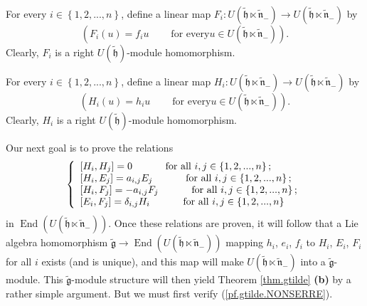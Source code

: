 \documentclass[etingof-lie.tex]{subfiles}
\begin{document}
For every $i\in\left\{  1,2,...,n\right\}  $, define a linear map
$F_{i}:U\left(  \widetilde{\mathfrak{h}}\ltimes\widetilde{\mathfrak{n}}%
_{-}\right)  \rightarrow U\left(  \widetilde{\mathfrak{h}}\ltimes
\widetilde{\mathfrak{n}}_{-}\right)  $ by%
\[
\left(  F_{i}\left(  u\right)  =f_{i}u\ \ \ \ \ \ \ \ \ \ \text{for every
}u\in U\left(  \widetilde{\mathfrak{h}}\ltimes\widetilde{\mathfrak{n}}%
_{-}\right)  \right)  .
\]
Clearly, $F_{i}$ is a right $U\left(  \widetilde{\mathfrak{h}}\right)
$-module homomorphism.

For every $i\in\left\{  1,2,...,n\right\}  $, define a linear map
$H_{i}:U\left(  \widetilde{\mathfrak{h}}\ltimes\widetilde{\mathfrak{n}}%
_{-}\right)  \rightarrow U\left(  \widetilde{\mathfrak{h}}\ltimes
\widetilde{\mathfrak{n}}_{-}\right)  $ by%
\[
\left(  H_{i}\left(  u\right)  =h_{i}u\ \ \ \ \ \ \ \ \ \ \text{for every
}u\in U\left(  \widetilde{\mathfrak{h}}\ltimes\widetilde{\mathfrak{n}}%
_{-}\right)  \right)  .
\]
Clearly, $H_{i}$ is a right $U\left(  \widetilde{\mathfrak{h}}\right)
$-module homomorphism.

Our next goal is to prove the relations%
\begin{equation}
\left\{
\begin{array}
[c]{l}%
\left[  H_{i},H_{j}\right]  =0\ \ \ \ \ \ \ \ \ \ \text{for all }%
i,j\in\left\{  1,2,...,n\right\}  ;\\
\left[  H_{i},E_{j}\right]  =a_{i,j}E_{j}\ \ \ \ \ \ \ \ \ \ \text{for all
}i,j\in\left\{  1,2,...,n\right\}  ;\\
\left[  H_{i},F_{j}\right]  =-a_{i,j}F_{j}\ \ \ \ \ \ \ \ \ \ \text{for all
}i,j\in\left\{  1,2,...,n\right\}  ;\\
\left[  E_{i},F_{j}\right]  =\delta_{i,j}H_{i}\ \ \ \ \ \ \ \ \ \ \text{for
all }i,j\in\left\{  1,2,...,n\right\}
\end{array}
\right.  \label{pf.gtilde.NONSERRE}%
\end{equation}
in $\operatorname*{End}\left(  U\left(  \widetilde{\mathfrak{h}}%
\ltimes\widetilde{\mathfrak{n}}_{-}\right)  \right)  $. Once these relations
are proven, it will follow that a Lie algebra homomorphism
$\widetilde{\mathfrak{g}}\rightarrow\operatorname*{End}\left(  U\left(
\widetilde{\mathfrak{h}}\ltimes\widetilde{\mathfrak{n}}_{-}\right)  \right)  $
mapping $h_{i}$, $e_{i}$, $f_{i}$ to $H_{i}$, $E_{i}$, $F_{i}$ for all $i$
exists (and is unique), and this map will make $U\left(
\widetilde{\mathfrak{h}}\ltimes\widetilde{\mathfrak{n}}_{-}\right)  $ into a
$\widetilde{\mathfrak{g}}$-module. This $\widetilde{\mathfrak{g}}$-module
structure will then yield Theorem \ref{thm.gtilde} \textbf{(b)} by a rather
simple argument. But we must first verify (\ref{pf.gtilde.NONSERRE}).
\end{document}
